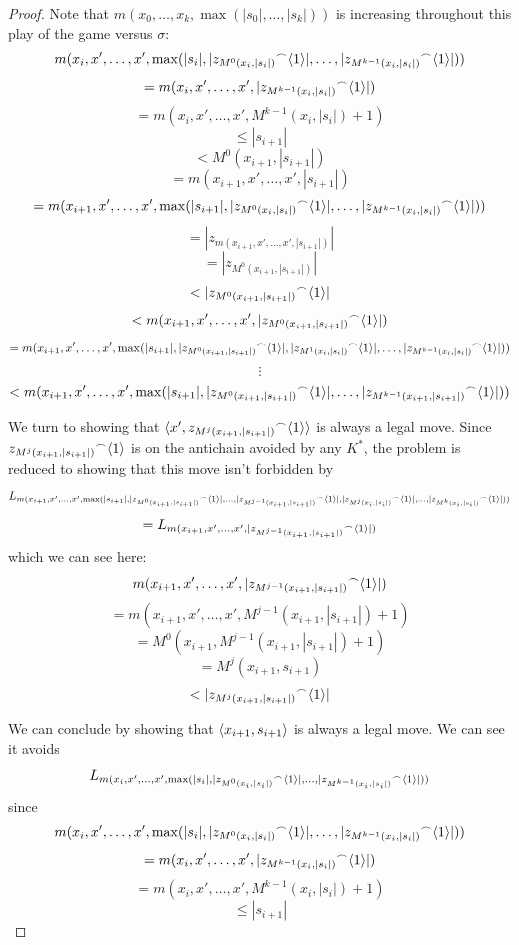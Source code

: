 \begin{proof}
Note that $m(x_0,\dots,x_{k},\max(|s_0|,\dots,|s_k|))$ is increasing throughout this play of the game versus $\sigma$:
  \[
    m(x_i,x',\dots,x',\max(|s_i|,|{z_{M^0(x_i,|s_i|)}}^\frown\langle1\rangle|,\dots,|{z_{M^{k-1}(x_i,|s_i|)}}^\frown\langle1\rangle|))
  \]
  \[
    =
    m(x_i,x',\dots,x',|{z_{M^{k-1}(x_i,|s_i|)}}^\frown\langle1\rangle|)
  \]
  \[
    =
    m(x_i,x',\dots,x',M^{k-1}(x_i,|s_i|)+1)
  \]
  \[
    \leq
    |s_{i+1}| 
  \]
  \[
    <
    M^0(x_{i+1},|s_{i+1}|)
  \]
  \[
    =
    m(x_{i+1},x',\dots,x',|s_{i+1}|)
  \]
  \[
    =
    m(x_{i+1},x',\dots,x',\max(|s_{i+1}|,|{z_{M^0(x_i,|s_i|)}}^\frown\langle1\rangle|,\dots,|{z_{M^{k-1}(x_i,|s_i|)}}^\frown\langle1\rangle|))
  \]
  \[
    =
    |{z_{m(x_{i+1},x',\dots,x',|s_{i+1}|)}}|
  \]
  \[
    =
    |{z_{M^0(x_{i+1},|s_{i+1}|)}}|
  \]
  \[
    <
    |{z_{M^0(x_{i+1},|s_{i+1}|)}}^\frown\langle1\rangle|
  \]
  \[
    <
    m(x_{i+1},x',\dots,x',|{z_{M^0(x_{i+1},|s_{i+1}|)}}^\frown\langle1\rangle|)
  \]
  \[
    =
    m(x_{i+1},x',\dots,x',\max(|s_{i+1}|,|{z_{M^0(x_{i+1},|s_{i+1}|)}}^\frown\langle1\rangle|,|{z_{M^1(x_{i},|s_{i}|)}}^\frown\langle1\rangle|,\dots,|{z_{M^{k-1}(x_{i},|s_{i}|)}}^\frown\langle1\rangle|))
  \]
  \[
    \vdots
  \]
  \[
    <
    m(x_{i+1},x',\dots,x',\max(|s_{i+1}|,|{z_{M^0(x_{i+1},|s_{i+1}|)}}^\frown\langle1\rangle|,\dots,|{z_{M^{k-1}(x_{i+1},|s_{i+1}|)}}^\frown\langle1\rangle|))
  \]

We turn to showing that $\langle x', {z_{M^j(x_{i+1},|s_{i+1}|)}}^\frown\langle1\rangle\rangle$ is always a legal move. Since ${z_{M^j(x_{i+1},|s_{i+1}|)}}^\frown\langle1\rangle$ is on the antichain avoided by any $K^*$, the problem is reduced to showing that this move isn't forbidden by
  \[
    L_{m(x_{i+1},x',\dots,x',\max(|s_{i+1}|,|{z_{M^0(x_{i+1},|s_{i+1}|)}}^\frown\langle1\rangle|,\dots,|{z_{M^{j-1}(x_{i+1},|s_{i+1}|)}}^\frown\langle1\rangle|,|{z_{M^{j}(x_{i},|s_{i}|)}}^\frown\langle1\rangle|,\dots,|{z_{M^{k}(x_{i},|s_{i}|)}}^\frown\langle1\rangle|))}
  \]
  \[
    =
    L_{m(x_{i+1},x',\dots,x',|{z_{M^{j-1}(x_{i+1},|s_{i+1}|)}}^\frown\langle1\rangle|)}
  \]
which we can see here:
  \[
    m(x_{i+1},x',\dots,x',|{z_{M^{j-1}(x_{i+1},|s_{i+1}|)}}^\frown\langle1\rangle|)
  \]
  \[
    =
    m(x_{i+1},x',\dots,x',M^{j-1}(x_{i+1},|s_{i+1}|)+1)
  \]
  \[
    =
    M^0(x_{i+1},M^{j-1}(x_{i+1},|s_{i+1}|)+1)
  \]
  \[
    =
    M^j(x_{i+1},s_{i+1})
  \]
  \[
    <
    |{z_{M^j(x_{i+1},|s_{i+1}|)}}^\frown\langle1\rangle|
  \]

We can conclude by showing that $\langle x_{i+1},s_{i+1}\rangle$ is always a legal move. We can see it avoids 
  \[
  L_{m(x_{i},x',\dots,x',\max(|s_{i}|,|{z_{M^0(x_i,|s_i|)}}^\frown\langle1\rangle|,\dots,|{z_{M^{k-1}(x_i,|s_i|)}}^\frown\langle1\rangle|))}
  \]
since
  \[
    m(x_{i},x',\dots,x',\max(|s_{i}|,|{z_{M^0(x_i,|s_i|)}}^\frown\langle1\rangle|,\dots,|{z_{M^{k-1}(x_i,|s_i|)}}^\frown\langle1\rangle|))
  \]
  \[
    =
    m(x_{i},x',\dots,x',|{z_{M^{k-1}(x_i,|s_i|)}}^\frown\langle1\rangle|)
  \]
  \[
    =
    m(x_{i},x',\dots,x',M^{k-1}(x_i,|s_i|)+1)
  \]
  \[
    \leq
    |s_{i+1}|
  \]




\end{proof}
